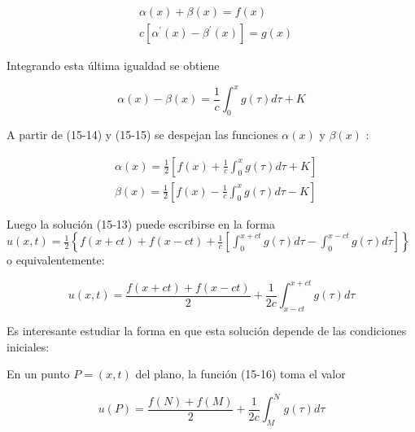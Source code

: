 \documentclass[10pt]{article}
\theoremstyle{plain}
\theoremstyle{definition}
\theoremstyle{remark}
\begin{document}
\begin{align*}
& \alpha(x)+\beta(x)=f(x) \\
& c\left[\alpha^{\prime}(x)-\beta^{\prime}(x)\right]=g(x) \tag{15-14}
\end{align*}


Integrando esta última igualdad se obtiene


\begin{equation*}
\alpha(x)-\beta(x)=\frac{1}{c} \int_{0}^{x} g(\tau) d \tau+K \tag{15-15}
\end{equation*}


A partir de (15-14) y (15-15) se despejan las funciones $\alpha(x)$ y $\beta(x)$ :

$$
\begin{aligned}
& \alpha(x)=\frac{1}{2}\left[f(x)+\frac{1}{c} \int_{0}^{x} g(\tau) d \tau+K\right] \\
& \beta(x)=\frac{1}{2}\left[f(x)-\frac{1}{c} \int_{0}^{x} g(\tau) d \tau-K\right]
\end{aligned}
$$

Luego la solución (15-13) puede escribirse en la forma $u(x, t)=\frac{1}{2}\left\{f(x+c t)+f(x-c t)+\frac{1}{c}\left[\int_{0}^{x+c t} g(\tau) d \tau-\int_{0}^{x-c t} g(\tau) d \tau\right]\right\}$ o equivalentemente:


\begin{equation*}
u(x, t)=\frac{f(x+c t)+f(x-c t)}{2}+\frac{1}{2 c} \int_{x-c t}^{x+c t} g(\tau) d \tau \tag{15-16}
\end{equation*}


Es interesante estudiar la forma en que esta solución depende de las condiciones iniciales:

En un punto $P=(x, t)$ del plano, la función (15-16) toma el valor

$$
u(P)=\frac{f(N)+f(M)}{2}+\frac{1}{2 c} \int_{M}^{N} g(\tau) d \tau
$$
\end{document}
